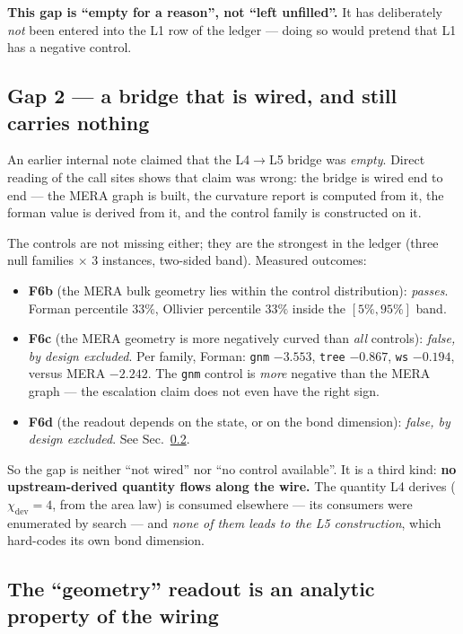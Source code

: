 \documentclass[11pt,a4paper]{article}
\newcommand{\code}[1]{\texttt{\small #1}}
\begin{document}
\medskip
\noindent\textbf{This gap is ``empty for a reason'', not ``left unfilled''.} It has
deliberately \emph{not} been entered into the L1 row of the ledger --- doing so would
pretend that L1 has a negative control.

\subsection{Gap 2 --- a bridge that is wired, and still carries nothing}
\label{sec:l4l5}

An earlier internal note claimed that the L4$\to$L5 bridge was \emph{empty}. Direct
reading of the call sites shows that claim was wrong: the bridge is wired end to
end --- the MERA graph is built, the curvature report is computed from it, the
forman value is derived from it, and the control family is constructed on it.

The controls are not missing either; they are the strongest in the ledger (three
null families $\times$ 3 instances, two-sided band). Measured outcomes:

\begin{itemize}[leftmargin=1.4em,itemsep=2pt]
  \item \textbf{F6b} (the MERA bulk geometry lies within the control distribution):
        \emph{passes}. Forman percentile $33\%$, Ollivier percentile $33\%$ inside
        the $[5\%,95\%]$ band.
  \item \textbf{F6c} (the MERA geometry is more negatively curved than \emph{all}
        controls): \emph{false, by design excluded}. Per family, Forman:
        \code{gnm} $-3.553$, \code{tree} $-0.867$, \code{ws} $-0.194$, versus MERA
        $-2.242$. The \code{gnm} control is \emph{more} negative than the MERA
        graph --- the escalation claim does not even have the right sign.
  \item \textbf{F6d} (the readout depends on the state, or on the bond dimension):
        \emph{false, by design excluded}. See Sec.~\ref{sec:l5geometry}.
\end{itemize}

\noindent So the gap is neither ``not wired'' nor ``no control available''. It is a
third kind: \textbf{no upstream-derived quantity flows along the wire.} The quantity
L4 derives ($\chi_{\text{dev}} = 4$, from the area law) is consumed elsewhere --- its
consumers were enumerated by search --- and \emph{none of them leads to the L5
construction}, which hard-codes its own bond dimension.

\subsection{The ``geometry'' readout is an analytic property of the wiring}
\label{sec:l5geometry}
\end{document}
